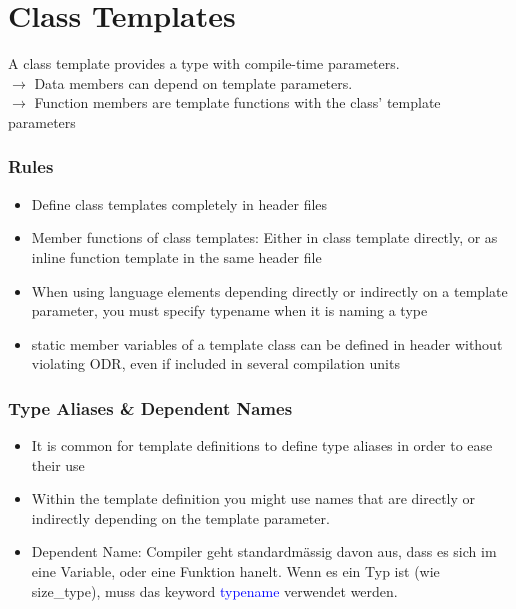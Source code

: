 
\section{Class Templates}

A class template provides a type with compile-time parameters.\\
$\rightarrow$ Data members can depend on template parameters.\\
$\rightarrow$ Function members are template functions with the class' template parameters

\subsubsection{Rules}
\begin{itemize}
    \item Define class templates completely in header files
    \item Member functions of class templates: Either in class template directly, or as inline function template in the same header file
    \item When using language elements depending directly or indirectly on a template parameter, you must
    specify typename when it is naming a type
    \item static member variables of a template class can be defined in header without violating ODR, even
    if included in several compilation units
\end{itemize}

\subsubsection{Type Aliases \& Dependent Names}
\begin{itemize}
    \item It is common for template definitions to define type aliases in order to ease their use
    \item Within the template definition you might use names that are directly or indirectly depending on the
    template parameter.
    \item Dependent Name: Compiler geht standardmässig davon aus, dass es sich im eine Variable, oder eine Funktion hanelt. Wenn es ein Typ ist (wie size\_type), muss das keyword \textcolor{blue}{typename} verwendet werden.
\end{itemize}

